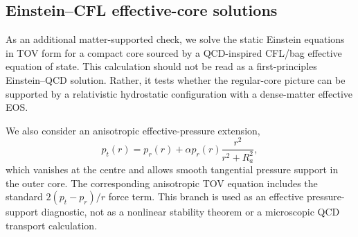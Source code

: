 \subsection{Einstein--CFL effective-core solutions}
\label{sec:einstein_cfl_effective_solutions}

As an additional matter-supported check, we solve the static Einstein equations
in TOV form for a compact core sourced by a QCD-inspired CFL/bag effective
equation of state. This calculation should not be read as a first-principles
Einstein--QCD solution. Rather, it tests whether the regular-core picture can be
supported by a relativistic hydrostatic configuration with a dense-matter
effective EOS.

We also consider an anisotropic effective-pressure extension,
\[
p_t(r)=p_r(r)+\alpha p_r(r)\frac{r^2}{r^2+R_a^2},
\]
which vanishes at the centre and allows smooth tangential pressure support in
the outer core. The corresponding anisotropic TOV equation includes the
standard \(2(p_t-p_r)/r\) force term. This branch is used as an effective
pressure-support diagnostic, not as a nonlinear stability theorem or a
microscopic QCD transport calculation.
